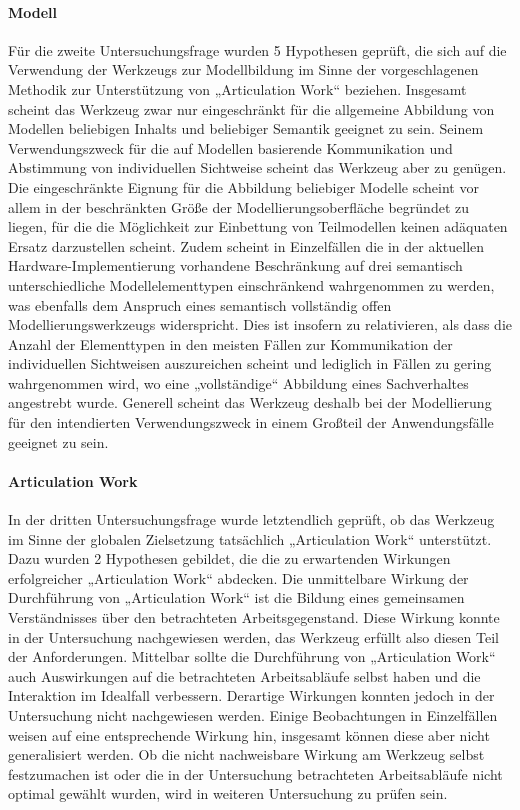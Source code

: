 \paragraph{Modell} %
Für die zweite Untersuchungsfrage wurden 5 Hypothesen geprüft, die sich auf die Verwendung der Werkzeugs zur Modellbildung im Sinne der vorgeschlagenen Methodik zur Unterstützung von „Articulation Work“ beziehen. Insgesamt scheint das Werkzeug zwar nur eingeschränkt für die allgemeine Abbildung von Modellen beliebigen Inhalts und beliebiger Semantik geeignet zu sein. Seinem Verwendungszweck für die auf Modellen basierende Kommunikation und Abstimmung von individuellen Sichtweise scheint das Werkzeug aber zu genügen. Die eingeschränkte Eignung für die Abbildung beliebiger Modelle scheint vor allem in der beschränkten Größe der Modellierungsoberfläche begründet zu liegen, für die die Möglichkeit zur Einbettung von Teilmodellen keinen adäquaten Ersatz darzustellen scheint. Zudem scheint in Einzelfällen die in der aktuellen Hardware-Implementierung vorhandene Beschränkung auf drei semantisch unterschiedliche Modellelementtypen einschränkend wahrgenommen zu werden, was ebenfalls dem Anspruch eines semantisch vollständig offen Modellierungswerkzeugs widerspricht. Dies ist insofern zu relativieren, als dass die Anzahl der Elementtypen in den meisten Fällen zur Kommunikation der individuellen Sichtweisen auszureichen scheint und lediglich in Fällen zu gering wahrgenommen wird, wo eine „vollständige“ Abbildung eines Sachverhaltes angestrebt wurde. Generell scheint das Werkzeug deshalb bei der Modellierung für den intendierten Verwendungszweck in einem Großteil der Anwendungsfälle geeignet zu sein.

\paragraph{Articulation Work} %
In der dritten Untersuchungsfrage wurde letztendlich geprüft, ob das Werkzeug im Sinne der globalen Zielsetzung tatsächlich „Articulation Work“ unterstützt. Dazu wurden 2 Hypothesen gebildet, die die zu erwartenden Wirkungen erfolgreicher „Articulation Work“ abdecken. Die unmittelbare Wirkung der Durchführung von „Articulation Work“ ist die Bildung eines gemeinsamen Verständnisses über den betrachteten Arbeitsgegenstand. Diese Wirkung konnte in der Untersuchung nachgewiesen werden, das Werkzeug erfüllt also diesen Teil der Anforderungen. Mittelbar sollte die Durchführung von „Articulation Work“ auch Auswirkungen auf die betrachteten Arbeitsabläufe selbst haben und die Interaktion im Idealfall verbessern. Derartige Wirkungen konnten jedoch in der Untersuchung nicht nachgewiesen werden. Einige Beobachtungen in Einzelfällen weisen auf eine entsprechende Wirkung hin, insgesamt können diese aber nicht generalisiert werden. Ob die nicht nachweisbare Wirkung am Werkzeug selbst festzumachen ist oder die in der Untersuchung betrachteten Arbeitsabläufe nicht optimal gewählt wurden, wird in weiteren Untersuchung zu prüfen sein.

